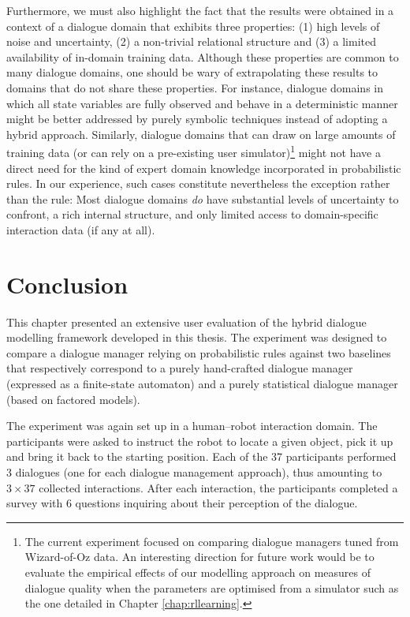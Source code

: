 Furthermore, we must also highlight the fact that the results were obtained in a context of a dialogue domain that exhibits three properties: (1) high levels of noise and uncertainty, (2) a non-trivial relational structure and (3) a limited availability of in-domain training data.  Although these properties are common to many dialogue domains, one should be wary of extrapolating these results to domains that do not share these properties.  For instance, dialogue domains in which all state variables are fully observed and behave in a deterministic manner might be better addressed by purely symbolic techniques instead of adopting a hybrid approach. Similarly, dialogue domains that can draw on large amounts of training data (or can rely on a pre-existing user simulator)\footnote{The current experiment  focused on comparing dialogue managers tuned from Wizard-of-Oz data. An interesting direction for future work would be to evaluate the empirical effects of our modelling approach on measures of dialogue quality when the parameters are optimised from a simulator such as the one detailed in Chapter \ref{chap:rllearning}.} might not have a direct need for the kind of expert domain knowledge incorporated in probabilistic rules.   In our experience, such cases constitute nevertheless the exception rather than the rule: Most dialogue domains \textit{do} have substantial levels of uncertainty to confront, a rich internal structure, and only limited access to domain-specific interaction data (if any at all). 


\section{Conclusion}

This chapter presented an extensive user evaluation of the hybrid dialogue modelling framework developed in this thesis.  The experiment was designed to compare a dialogue manager relying on probabilistic rules against two baselines that respectively correspond to a purely hand-crafted dialogue manager (expressed as a finite-state automaton) and a purely statistical dialogue manager (based on factored models). 

The experiment was again set up in a human--robot interaction domain.  The participants were asked to instruct the robot to locate a given object, pick it up and bring it back to the starting position.  Each of the 37 participants performed 3 dialogues (one for each dialogue management approach), thus amounting to $3 \times 37$ collected interactions.  After each interaction, the participants completed a survey with 6 questions inquiring about their perception of the dialogue. 

